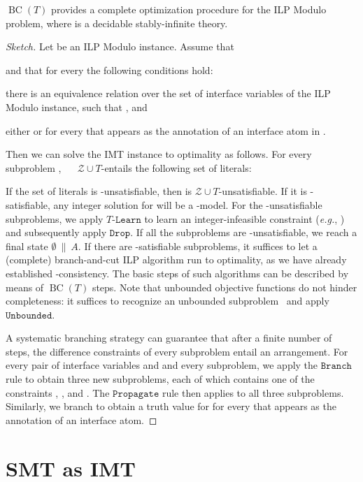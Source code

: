 \documentclass{llncs}
\newcommand{\eg}[0]{\emph{e.g.}, }
\newcommand{\tr}[1]{\ensuremath{\mathtt{#1}}}
\newcommand{\ttr}[1]{\ensuremath{T\text{-}\mathtt{#1}}}
\newcommand{\state}[2]{\ensuremath{#1\ \|\ #2}}
\newcommand{\ZT}[0]{\ensuremath{\mathcal{Z} \cup T}}
\newcommand{\bct}[0]{\ensuremath{\operatorname{BC}(T)}}
\begin{document}
\begin{theorem}[Completeness]
  \label{thm:complete}
  \bct{} provides a complete optimization procedure for the ILP Modulo
   problem, where  is a decidable stably-infinite theory.
\end{theorem}
\begin{proof}[Sketch]
  Let  be an ILP Modulo  instance. Assume that
  
  and that for every  the following conditions hold:
  \begin{inparaenum}[(a)]
  \item there is an equivalence relation  over the set of
    interface variables  of the ILP Modulo  instance, such that
    , and
  \item either  or  for every
     that appears as the annotation of an interface atom in .
  \end{inparaenum}
  Then we can solve the IMT instance to optimality as follows. For
  every subproblem , ~~ \ZT{}-entails
  the following set of literals:
  
  If the set of literals is -unsatisfiable, then  is \ZT{}-unsatisfiable. If it is -satisfiable, any integer
  solution for  will be a -model. For the
  -unsatisfiable subproblems, we apply \ttr{Learn} to learn an
  integer-infeasible constraint (\eg ) and subsequently apply
  \tr{Drop}. If all the subproblems are -unsatisfiable, we reach a
  final state \state{\emptyset}{A}. If there are -satisfiable
  subproblems, it suffices to let a (complete) branch-and-cut ILP
  algorithm run to optimality, as we have already established
  -consistency. The basic steps of such algorithms can be described
  by means of \bct{} steps. Note that unbounded objective functions do
  not hinder completeness: it suffices to recognize an unbounded
  subproblem~\cite{unboundedip} and apply \tr{Unbounded}.

  A systematic branching strategy can guarantee that after a finite
  number of steps, the difference constraints of every subproblem
  entail an arrangement. For every pair of interface variables  and
   and every subproblem, we apply the \tr{Branch} rule to obtain
  three new subproblems, each of which contains one of the constraints
  , , and . The \tr{Propagate} rule
  then applies to all three subproblems. Similarly, we branch to
  obtain a truth value for  for every  that appears as the
  annotation of an interface atom.
\end{proof}

\section{SMT as IMT}
\label{sec:smt}
\end{document}
